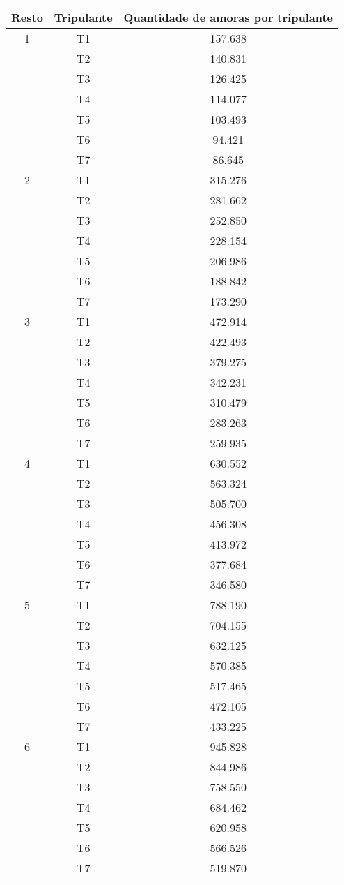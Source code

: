 \documentclass[12pt]{article}
\begin{document}
\begin{table}[H]

\centering

\begin{tabular}{|c|c|c|}

\hline
Resto & Tripulante & Quantidade de amoras por tripulante \\
\hline
1 & T1 & 157.638 \\
\cline{2-3}
& T2 & 140.831 \\
\cline{2-3}
& T3 & 126.425 \\
\cline{2-3}
& T4 & 114.077 \\
\cline{2-3}
& T5 & 103.493 \\
\cline{2-3}
& T6 & 94.421 \\
\cline{2-3}
& T7 & 86.645 \\
\hline
2 & T1 & 315.276 \\
\cline{2-3}
& T2 & 281.662 \\
\cline{2-3}
& T3 & 252.850 \\
\cline{2-3}
& T4 & 228.154 \\
\cline{2-3}
& T5 & 206.986 \\
\cline{2-3}
& T6 & 188.842 \\
\cline{2-3}
& T7 & 173.290 \\
\hline 
3 & T1 & 472.914 \\
\cline{2-3}
& T2 & 422.493 \\
\cline{2-3}
& T3 & 379.275 \\
\cline{2-3}
& T4 & 342.231 \\
\cline{2-3}
& T5 & 310.479 \\
\cline{2-3}
& T6 & 283.263 \\
\cline{2-3}
& T7 & 259.935 \\
\hline
4 & T1 & 630.552 \\
\cline{2-3}
& T2 & 563.324 \\
\cline{2-3}
& T3 & 505.700 \\
\cline{2-3}
& T4 & 456.308 \\
\cline{2-3}
& T5 & 413.972 \\
\cline{2-3}
& T6 & 377.684 \\
\cline{2-3}
& T7 & 346.580 \\
\hline 
5 & T1 & 788.190 \\
\cline{2-3}
& T2 & 704.155 \\
\cline{2-3}
& T3 & 632.125 \\
\cline{2-3}
& T4 & 570.385 \\
\cline{2-3}
& T5 & 517.465 \\
\cline{2-3}
& T6 & 472.105 \\
\cline{2-3}
& T7 & 433.225 \\
\hline
6 & T1 & 945.828 \\
\cline{2-3}
& T2 & 844.986 \\
\cline{2-3}
& T3 & 758.550 \\
\cline{2-3}
& T4 & 684.462 \\
\cline{2-3}
& T5 & 620.958 \\
\cline{2-3}
& T6 & 566.526 \\
\cline{2-3}
& T7 & 519.870 \\
\hline


\end{tabular}
\end{table}
\end{document}
